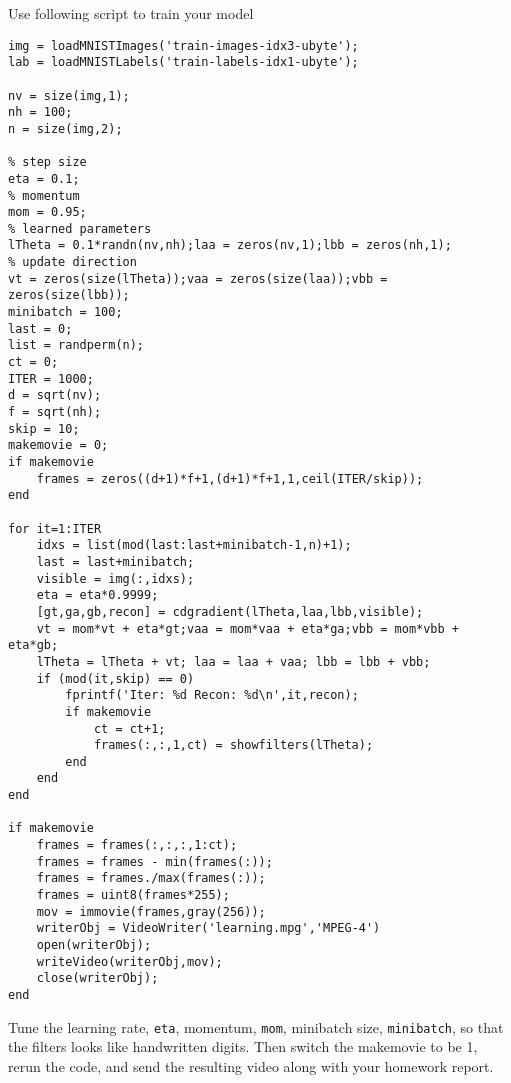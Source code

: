 \documentclass{article}
\begin{document}
Use following script to train your model
\begin{verbatim}
img = loadMNISTImages('train-images-idx3-ubyte');
lab = loadMNISTLabels('train-labels-idx1-ubyte');

nv = size(img,1);
nh = 100;
n = size(img,2);

% step size
eta = 0.1;
% momentum
mom = 0.95;
% learned parameters
lTheta = 0.1*randn(nv,nh);laa = zeros(nv,1);lbb = zeros(nh,1);
% update direction
vt = zeros(size(lTheta));vaa = zeros(size(laa));vbb = zeros(size(lbb));
minibatch = 100;
last = 0;
list = randperm(n);
ct = 0;
ITER = 1000;
d = sqrt(nv);
f = sqrt(nh);
skip = 10;
makemovie = 0;
if makemovie
    frames = zeros((d+1)*f+1,(d+1)*f+1,1,ceil(ITER/skip));
end

for it=1:ITER
    idxs = list(mod(last:last+minibatch-1,n)+1);
    last = last+minibatch;
    visible = img(:,idxs);
    eta = eta*0.9999;
    [gt,ga,gb,recon] = cdgradient(lTheta,laa,lbb,visible);
    vt = mom*vt + eta*gt;vaa = mom*vaa + eta*ga;vbb = mom*vbb + eta*gb;
    lTheta = lTheta + vt; laa = laa + vaa; lbb = lbb + vbb;
    if (mod(it,skip) == 0)
        fprintf('Iter: %d Recon: %d\n',it,recon);
        if makemovie
            ct = ct+1;
            frames(:,:,1,ct) = showfilters(lTheta);
        end
    end
end

if makemovie
    frames = frames(:,:,:,1:ct);
    frames = frames - min(frames(:));
    frames = frames./max(frames(:));
    frames = uint8(frames*255);
    mov = immovie(frames,gray(256));
    writerObj = VideoWriter('learning.mpg','MPEG-4')
    open(writerObj);
    writeVideo(writerObj,mov);
    close(writerObj);
end
\end{verbatim}
Tune the learning rate, \verb|eta|, momentum, \verb|mom|, minibatch size, \verb|minibatch|, so that
the filters looks like handwritten digits. Then switch the makemovie to be 1, rerun the code, and send the resulting video along with your homework report.
\end{document}
